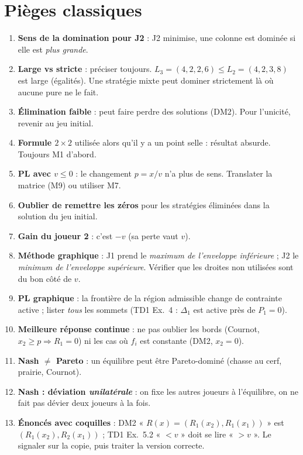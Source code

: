 \documentclass[11pt,a4paper]{article}
\begin{document}
\section{Pièges classiques}\label{sec:pieges}
\begin{piegebox}
\begin{enumerate}[leftmargin=*]
\item \textbf{Sens de la domination pour J2} : J2 minimise, une colonne est dominée si elle est \emph{plus grande}.
\item \textbf{Large vs stricte} : préciser toujours. $L_3=(4,2,2,6)\le L_2=(4,2,3,8)$ est large (égalités). Une stratégie mixte peut dominer strictement là où aucune pure ne le fait.
\item \textbf{Élimination faible} : peut faire perdre des solutions (DM2). Pour l'unicité, revenir au jeu initial.
\item \textbf{Formule $2\times2$} utilisée alors qu'il y a un point selle : résultat absurde. Toujours M1 d'abord.
\item \textbf{PL avec $v\le0$} : le changement $p=x/v$ n'a plus de sens. Translater la matrice (M9) ou utiliser M7.
\item \textbf{Oublier de remettre les zéros} pour les stratégies éliminées dans la solution du jeu initial.
\item \textbf{Gain du joueur 2} : c'est $-v$ (sa perte vaut $v$).
\item \textbf{Méthode graphique} : J1 prend le \emph{maximum de l'enveloppe inférieure} ; J2 le \emph{minimum de l'enveloppe supérieure}. Vérifier que les droites non utilisées sont du bon côté de $v$.
\item \textbf{PL graphique} : la frontière de la région admissible change de contrainte active ; lister \emph{tous} les sommets (TD1 Ex.~4 : $\Delta_1$ est active près de $P_1=0$).
\item \textbf{Meilleure réponse continue} : ne pas oublier les bords (Cournot, $x_2\ge p\Rightarrow R_1=0$) ni les cas où $f_i$ est constante (DM2, $x_2=0$).
\item \textbf{Nash $\ne$ Pareto} : un équilibre peut être Pareto-dominé (chasse au cerf, prairie, Cournot).
\item \textbf{Nash : déviation \emph{unilatérale}} : on fixe les autres joueurs à l'équilibre, on ne fait pas dévier deux joueurs à la fois.
\item \textbf{Énoncés avec coquilles} : DM2 « $R(x)=(R_1(x_2),R_1(x_1))$ » est $(R_1(x_2),R_2(x_1))$ ; TD1 Ex.~5.2 « $<v$ » doit se lire « $>v$ ». Le signaler sur la copie, puis traiter la version correcte.
\end{enumerate}
\end{piegebox}
\end{document}
